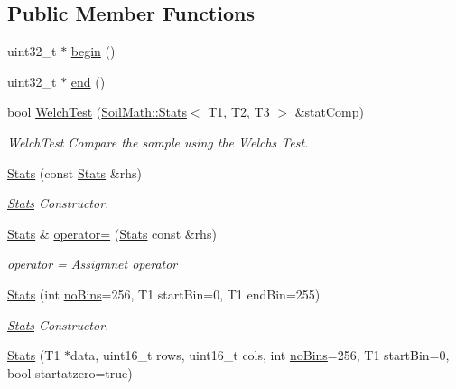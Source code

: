 \subsection*{Public Member Functions}
\begin{DoxyCompactItemize}
\item 
uint32\+\_\+t $\ast$ \hyperlink{class_soil_math_1_1_stats_ab4b0109ffb55f1d39acfad46bfd3bad5}{begin} ()
\item 
uint32\+\_\+t $\ast$ \hyperlink{class_soil_math_1_1_stats_a9d60ce82a2786e0422c3683c301f34ae}{end} ()
\item 
bool \hyperlink{class_soil_math_1_1_stats_a45f110fe8f440a4e45ef2b4e6cd9863c}{Welch\+Test} (\hyperlink{class_soil_math_1_1_stats}{Soil\+Math\+::\+Stats}$<$ T1, T2, T3 $>$ \&stat\+Comp)
\begin{DoxyCompactList}\small\item\em Welch\+Test Compare the sample using the Welch\textquotesingle{}s Test. \end{DoxyCompactList}\item 
\hyperlink{class_soil_math_1_1_stats_aa9727b7ea39b46f8a010a7b710b26d83}{Stats} (const \hyperlink{class_soil_math_1_1_stats}{Stats} \&rhs)
\begin{DoxyCompactList}\small\item\em \hyperlink{class_soil_math_1_1_stats}{Stats} Constructor. \end{DoxyCompactList}\item 
\hyperlink{class_soil_math_1_1_stats}{Stats} \& \hyperlink{class_soil_math_1_1_stats_ad3444d680b185196786b135f0a254a19}{operator=} (\hyperlink{class_soil_math_1_1_stats}{Stats} const \&rhs)
\begin{DoxyCompactList}\small\item\em operator = Assigmnet operator \end{DoxyCompactList}\item 
\hyperlink{class_soil_math_1_1_stats_a2bc3899fe78a6c5fedad5f22b90d9963}{Stats} (int \hyperlink{class_soil_math_1_1_stats_a4202c9085eacaff2e04eda84fc90e92b}{no\+Bins}=256, T1 start\+Bin=0, T1 end\+Bin=255)
\begin{DoxyCompactList}\small\item\em \hyperlink{class_soil_math_1_1_stats}{Stats} Constructor. \end{DoxyCompactList}\item 
\hyperlink{class_soil_math_1_1_stats_afee0afbb0228d8bb524dbe2b68c1e980}{Stats} (T1 $\ast$data, uint16\+\_\+t rows, uint16\+\_\+t cols, int \hyperlink{class_soil_math_1_1_stats_a4202c9085eacaff2e04eda84fc90e92b}{no\+Bins}=256, T1 start\+Bin=0, bool startatzero=true)

\end{DoxyCompactItemize}
